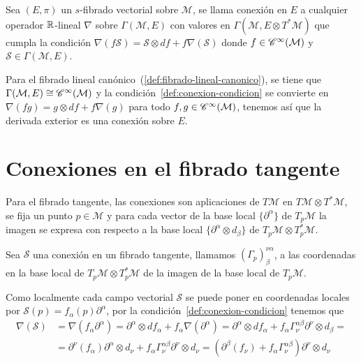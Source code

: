 \begin{definition}
  Sea $(E, \pi)$ un $s$-fibrado vectorial sobre $\mathcal{\mathcal{M}}$, se llama conexión en $E$ a cualquier operador $\mathbb{R}$-lineal
  $\nabla$ sobre $\Gamma(\mathcal{M}, E)$ con valores en $\Gamma(\mathcal{M}, E\otimes T^* \mathcal{M})$ que cumpla la condición $\nabla(f\mathcal{S})
  =\mathcal{S}\otimes df+f\nabla(\mathcal{S})$\label{def:conexion-condicion} donde $f\in\mathscr{C}^\infty(\mathcal{M})$ y
  $\mathcal{S}\in\Gamma(\mathcal{M}, E)$.
\end{definition}

Para el fibrado lineal canónico~(\ref{def:fibrado-lineal-canonico}), se tiene que $\Gamma(\mathcal{M}, E)
\cong\mathscr{C}^\infty(\mathcal{M})$ y la condición~\ref{def:conexion-condicion} se convierte en $\nabla(fg)=g\otimes df+f\nabla(g)$
para todo $f,g\in\mathscr{C}^\infty(\mathcal{M})$, tenemos así que la derivada exterior es una conexión sobre $E$.


\section{Conexiones en el fibrado tangente}\label{sec:conexiones-en-el-fibrado-tangente}

Para el fibrado tangente, las conexiones son aplicaciones de $T\mathcal{M}$ en $T\mathcal{M}\otimes T^*\mathcal{M}$, se fija un punto $p\in
\mathcal{M}$ y para cada vector de la base local $\{\partial^\alpha\}$ de $T_p \mathcal{M}$ la imagen se expresa con respecto a la
base local $\{\partial^\alpha\otimes d_\beta\}$ de $T_p\mathcal{M}\otimes T_p^*\mathcal{M}$.

\begin{definition}
  Sea $\mathcal{S}$ una conexión en un fibrado tangente, llamamos $(\Gamma_p)_\beta^{\nu\alpha}$,  a las coordenadas en la base local de $T_p\mathcal{M}\otimes T_p^*\mathcal{M}$ de la imagen
  de la base local de $T_p\mathcal{M}$.
\end{definition}

Como localmente cada campo vectorial $\mathcal{S}$ se
puede poner en coordenadas locales por $\mathcal{S}(p)=f_\alpha(p)\partial^\alpha$, por la condición~\ref{def:conexion-condicion} tenemos que
\begin{equation*}
  \begin{split}
    \nabla(\mathcal{S}) &=\nabla(f_\alpha
    \partial^\alpha)=\partial^\alpha\otimes df_\alpha+f_\alpha\nabla(\partial^\alpha)=
    \partial^\alpha\otimes df_\alpha+f_\alpha\Gamma_\nu^{\alpha\beta}\partial^\nu\otimes d_\beta=\\
    & = \partial^\nu(f_\alpha)\partial^\alpha\otimes d_\nu+f_\alpha\Gamma_\nu^{\alpha\beta}
    \partial^\nu\otimes d_\nu=(\partial^\beta(f_\nu)+f_\alpha\Gamma_\nu^{\alpha\beta})
    \partial^\nu\otimes d_\nu
  \end{split}
\end{equation*}

